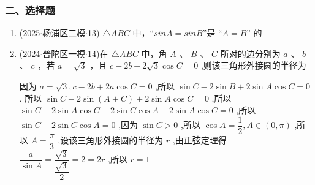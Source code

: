 \subsubsection*{二、选择题}
\begin{enumerate}
    \item (2025$\cdot$杨浦区二模$\cdot$13) $\bigtriangleup  {ABC}$ 中，“$sinA = sinB$”是 “$A = B$” 的 
    \item (2024$\cdot$普陀区一模$\cdot$14)在 $\bigtriangleup  {ABC}$ 中，角 $A$ 、 $B$ 、 $C$ 所对的边分别为 $a$ 、 $b$ 、 $c$ ，若 $a = \sqrt{3}$ ，且 $c - {2b} +  2\sqrt{3}\cos C = 0$ ,则该三角形外接圆的半径为 
    \begin{jieda}
        因为 $a = \sqrt{3},c - {2b} + {2a}\cos C = 0$ ,所以 $\sin C - 2\sin B +  2\sin A\cos C = 0$ . 所以 $\sin C - 2\sin \left( {A + C}\right)  + 2\sin A\cos C = 0$ ,所以 $\sin C - 2\sin A\cos C - 2\sin C\cos A + 2\sin A\cos C = 0$ ,所以 $\sin C - 2\sin C\cos A = 0$ ,因为 $\sin C > 0$ ,所以 $\cos A = \dfrac{1}{2},A \in  \left( {0,\pi }\right)$ ,所以 $A = \dfrac{\pi }{3}$ ,设该三角形外接圆的半径为 $r$ ,由正弦定理得 $\dfrac{a}{\sin A} = \dfrac{\sqrt{3}}{\dfrac{\sqrt{3}}{2}} = 2 = {2r}$ ,所以 $r = 1$
    \end{jieda}
\end{enumerate}


